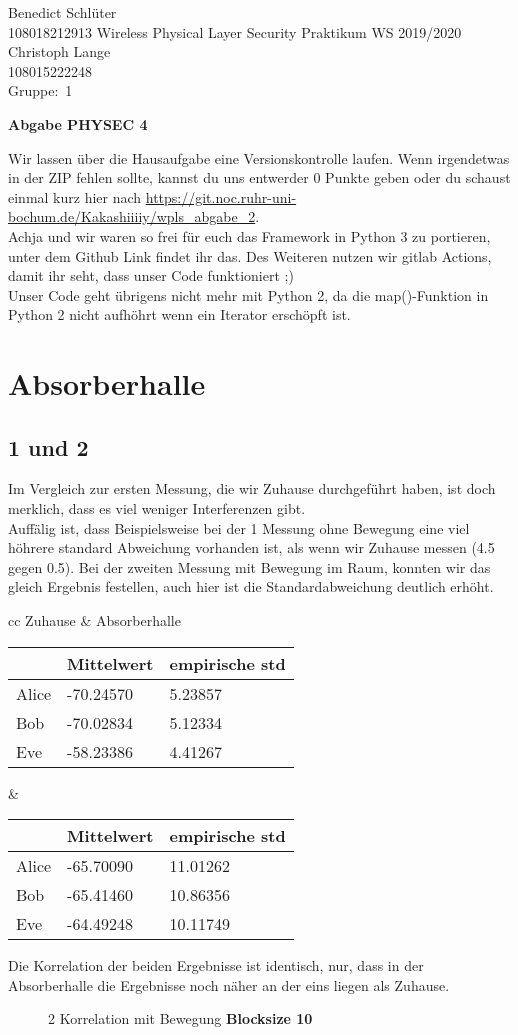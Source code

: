 \documentclass[12pt,a4paper]{article}
\newcommand{\student}{Benedict Schlüter\\ 108018212913 } %
\newcommand{\partner}{Christoph Lange\\ 108015222248} %
\newcommand{\group}{1} %
\newcommand{\hwheadtwo}{$ $
  \vspace{-2cm}
  
\noindent \student \qquad \qquad  Wireless Physical Layer Security Praktikum \hfill WS 2019/2020 \\
\noindent \partner \\
\noindent Gruppe:~\group\\
$ $

  
\begin{center}    
{\Large \bf Abgabe PHYSEC 4}
\end{center}
}
\begin{document}
\hwheadtwo
Wir lassen über die Hausaufgabe eine Versionskontrolle laufen. Wenn irgendetwas in der ZIP fehlen sollte, kannst du uns entwerder 0 Punkte geben oder du schaust einmal kurz hier nach \url{https://git.noc.ruhr-uni-bochum.de/Kakashiiiiy/wpls_abgabe_2}.\\
Achja und wir waren so frei für euch das Framework in Python 3 zu portieren, unter dem Github Link findet ihr das. Des Weiteren nutzen wir gitlab Actions, damit ihr seht, dass unser Code funktioniert ;)\\
Unser Code geht übrigens nicht mehr mit Python 2, da die map()-Funktion in Python 2 nicht aufhöhrt wenn ein Iterator erschöpft ist.
\section{Absorberhalle}
\subsection*{1 und 2 }
Im Vergleich zur ersten Messung, die wir Zuhause durchgeführt haben, ist doch merklich, dass es viel weniger Interferenzen gibt.\\ 
Auffälig ist, dass Beispielsweise bei der 1 Messung ohne Bewegung eine viel höhrere standard Abweichung vorhanden ist, als wenn wir Zuhause messen (4.5 gegen 0.5). Bei der zweiten Messung mit Bewegung im Raum, konnten wir das gleich Ergebnis festellen, auch hier ist die Standardabweichung deutlich erhöht.
\begin{table}[H]
\centering
\begin{tabular}{ cc }
Zuhause & Absorberhalle  \\
\begin{tabular}{l|l|l}
& Mittelwert & empirische std \\
\hline
Alice & -70.24570 & 5.23857 \\
\hline
Bob & -70.02834 & 5.12334 \\
\hline
Eve & -58.23386 & 4.41267 \\
\end{tabular} &
\begin{tabular}{l|l|l}
& Mittelwert & empirische std \\
\hline
Alice & -65.70090 & 11.01262 \\
\hline
Bob & -65.41460 & 10.86356 \\
\hline
Eve & -64.49248 & 10.11749 \\
\end{tabular}
\end{tabular}
\end{table}
Die Korrelation der beiden Ergebnisse ist identisch, nur, dass in der Absorberhalle die Ergebnisse noch näher an der eins liegen als Zuhause.
\begin{figure}[H]
\centering
{}   \qquad
{}
\caption{2 Korrelation mit Bewegung  \textbf{Blocksize 10}}
\label{fig:2}
\end{figure}
\end{document}

